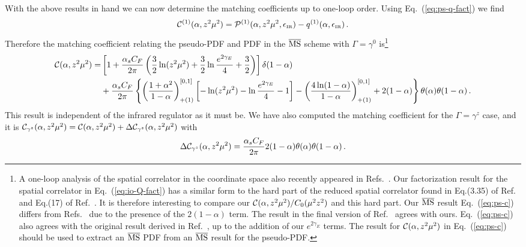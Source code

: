 \documentclass[prd,aps,twocolumn,preprintnumbers,showpacs,nofootinbib,superscriptaddress,notitlepage]{revtex4-1}
\newcommand{\beq}{\begin{eqnarray}}
\newcommand{\eeq}{\end{eqnarray}}
\newcommand{\nn}{\nonumber}
\newcommand{\spcorr}{spatial correlator\xspace}
\DeclareRobustCommand{\eq}[1]{Eq.~(\ref{eq:#1})}
\begin{document}
\begin{widetext}
With the above results in hand we can now determine the matching coefficients up to one-loop order.  Using \eq{ps-q-fact} we find
\beq \label{eq:pseudoC}
{\cal C}^{(1)}(\alpha,z^2\mu^2)= {\cal P}^{(1)}(\alpha,z^2\mu^2,\epsilon_{\mbox{\tiny IR}}) - q^{(1)}(\alpha,\epsilon_{\mbox{\tiny IR}}) \,.
\eeq
Therefore the matching coefficient relating the pseudo-PDF and PDF in the $\overline{\rm MS}$ scheme with $\Gamma=\gamma^0$ is\footnote{A one-loop analysis of the \spcorr in the coordinate space also recently appeared in Refs.~\cite{Radyushkin:2017lvu,Radyushkin:2018cvn}. Our factorization result for the \spcorr in \eq{io-Q-fact} has a similar form to the hard part of the reduced \spcorr found in Eq.(3.35) of Ref.~\cite{Radyushkin:2017lvu} and Eq.(17) of Ref.~\cite{Radyushkin:2018cvn}. It is therefore interesting to compare our ${\cal C}(\alpha,z^2\mu^2)/C_0(\mu^2z^2)$ and this hard part. Our $\overline{\rm MS}$ result  \eq{ps-c} differs from Refs.~\cite{Radyushkin:2017lvu} due to the presence of the $2(1-\alpha)$ term. The result in the final version of Ref.~\cite{Radyushkin:2018cvn} agrees with ours. \eq{ps-c} also agrees with the original result derived in Ref.~\cite{Ji:2017rah}, up to the addition of our $e^{2\gamma_E}$ terms. The result for ${\cal C}(\alpha,z^2\mu^2)$  in \eq{ps-c} should be used to extract an $\overline{\rm MS}$ PDF from an $\overline{\rm MS}$ result for the pseudo-PDF.}
\begin{align} \label{eq:ps-c}
{\cal C}(\alpha,z^2\mu^2)
	=& \left[ 1+ {\alpha_sC_F\over 2\pi}\left({3\over2}\ln(z^2\mu^2)+{3\over2}\ln{e^{2\gamma_E}\over 4}+{3\over2}\right)\right]\delta(1-\alpha)
 \\
 	&+ {\alpha_sC_F\over 2\pi}\left\{\left({1+\alpha^2\over 1-\alpha}\right)^{[0,1]}_{+(1)}\left[-\ln(z^2 \mu^2)-\ln{e^{2\gamma_E}\over 4}-1\right] - \left(4\ln(1-\alpha)\over 1-\alpha\right)^{[0,1]}_{+(1)}  +2(1-\alpha)\right\}\theta(\alpha)\theta(1-\alpha)
  \,. \nn
\end{align}
This result is independent of the infrared regulator as it must be.
We have also computed the matching coefficient for the $\Gamma=\gamma^z$ case, and it is ${\cal C}_{\gamma^z}(\alpha,z^2\mu^2) = {\cal C}(\alpha,z^2\mu^2) + \Delta {\cal C}_{\gamma^z}(\alpha,z^2\mu^2)$ with
\beq
\Delta {\cal C}_{\gamma^z}(\alpha,z^2\mu^2) = {\alpha_sC_F\over 2\pi} 2(1-\alpha)\theta(\alpha)\theta(1-\alpha)\,.
\eeq

\end{widetext}
\end{document}
